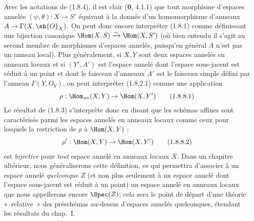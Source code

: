 \begin{env}[1.8.8]
\label{ega2:addendum:I.1.8.8-fr}
Avec les notations de (1.8.4), il est clair (\textbf{0}, 4.1.1) que tout
morphisme d'espaces annelés $(\psi,\theta):X\to S'$ équivaut à la
donnée d'un homomorphisme d'anneaux
$A\to\Gamma(X,\sh{O}_X)$. On peut donc encore interpréter (1.8.1)
comme définissant une bijection canonique
$\Hom(X,S)\xrightarrow{\sim}\Hom(X,S')$
(où bien entendu il s'agit au second membre de morphismes d'espaces
annelés, puisqu'en général $A$ n'est pas un anneau local). Plus
généralement, si $X,Y$ sont deux espaces annelés en anneaux locaux et
si $(Y',A')$ est l'espace annelé dont l'espace sous-jacent est réduit à
un point et dont le faisceau d'anneaux $A'$ est le faisceau simple
défini par l'anneau $\Gamma(Y,O_Y)$, on peut interpréter
(1.8.2.1) comme une application
\begin{equation}
\label{ega2:addendum:I.1.8.8.1-fr}
  \rho:\Hom_{\mathit{an}}(X,Y)\to\Hom(X,Y')
\tag{1.8.8.1}
\end{equation}
Le résultat de (1.8.3) s'interprète donc en disant que les schémas
affines sont caractérisés parmi les espaces annelés en anneaux locaux
comme ceux pour lesquels la restriction de $\rho$ à $\Hom(X,Y)$ :
\begin{equation}
\label{ega2:addendum:I.1.8.8.2-fr}
  \rho':\Hom(X,Y)\to\Hom(X,Y')
\tag{1.8.8.2}
\end{equation}
est \emph{bijective} pour \emph{tout} espace annelé en anneaux locaux $X$. Dans un
chapitre ultérieur, nous généraliserons cette définition, ce qui
permettra d'associer à un espace annelé \emph{quelconque} $Z$ (et non plus
seulement à un espace annelé dont l'espace sous-jacent est réduit à un
point) un espace annelé en anneaux locaux que nous appellerons encore
$\Spec(Z)$; cela sera le point de départ d'une théorie «~relative~» des
préschémas au-dessus d'espaces annelés quelconques, étendant les
résultats du chap.~I.
\end{env}

